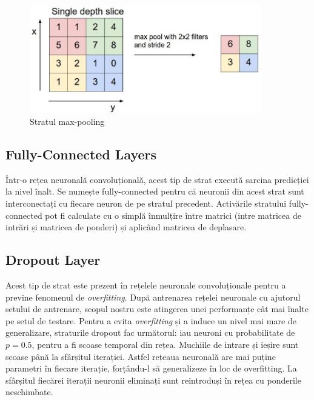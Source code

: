 \begin{figure}[h!]
    	\centering
	\captionsetup{justification=centering, margin=2cm}
	\includegraphics[width=0.9\textwidth]{figures/max_pol.jpg}
	\caption{Stratul max-pooling \cite{max_pol}}
	\label{fig:Stratul max-pooling }
\end{figure}

\subsection{Fully-Connected Layers}
Într-o rețea neuronală convoluțională, acest tip de strat execută sarcina predicției la nivel înalt. Se numește fully-connected pentru că neuronii din acest strat sunt interconectați cu fiecare neuron de pe stratul precedent. Activările stratului fully-connected pot fi calculate cu o simplă înmulțire între matrici (intre matricea de intrări și matricea de ponderi) și aplicând matricea de deplasare.

\subsection{Dropout Layer}
Acest tip de strat este prezent în rețelele neuronale convoluționale pentru a previne fenomenul de \textit{overfitting}. După antrenarea rețelei neuronale cu ajutorul setului de antrenare, scopul nostru este atingerea unei performanțe cât mai înalte pe setul de testare. Pentru a evita \textit{overfitting} și a induce un nivel mai mare de generalizare, straturile dropout fac următorul: iau neuroni cu probabilitate de $p=0.5$, pentru a fi scoase temporal din rețea. Muchiile de intrare și ieșire sunt scoase până la sfârșitul iterației. Astfel rețeaua neuronală are mai puține parametri în fiecare iterație, forțându-l să generalizeze în loc de overfitting. La sfârșitul fiecărei iterații neuronii eliminați sunt reintroduși în rețea cu ponderile neschimbate.

